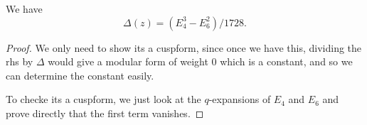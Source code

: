 \begin{lemma}\label{lemma:disc-E4E6}\leanok {}
We have
\begin{equation}
\Delta(z) = (E_4^3-E_6^2)/1728.
\end{equation}
\end{lemma}
\begin{proof}
We only need to show its a cuspform, since once we have this, dividing the rhs by $\Delta$ would give a modular form of weight $0$ which is a constant, and so we can determine the constant easily.

To checke its a cuspform, we just look at  the $q$-expansions of $E_4$ and $E_6$ and prove directly that the first term vanishes.

\end{proof}

